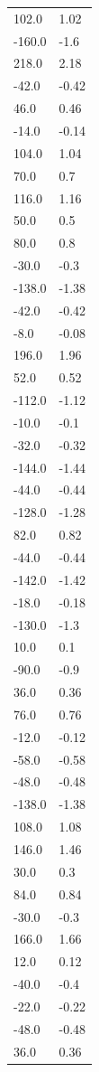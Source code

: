 \begin{longtable}{ll}
102.0 & 1.02 \\
-160.0 & -1.6 \\
218.0 & 2.18 \\
-42.0 & -0.42 \\
46.0 & 0.46 \\
-14.0 & -0.14 \\
104.0 & 1.04 \\
70.0 & 0.7 \\
116.0 & 1.16 \\
50.0 & 0.5 \\
80.0 & 0.8 \\
-30.0 & -0.3 \\
-138.0 & -1.38 \\
-42.0 & -0.42 \\
-8.0 & -0.08 \\
196.0 & 1.96 \\
52.0 & 0.52 \\
-112.0 & -1.12 \\
-10.0 & -0.1 \\
-32.0 & -0.32 \\
-144.0 & -1.44 \\
-44.0 & -0.44 \\
-128.0 & -1.28 \\
82.0 & 0.82 \\
-44.0 & -0.44 \\
-142.0 & -1.42 \\
-18.0 & -0.18 \\
-130.0 & -1.3 \\
10.0 & 0.1 \\
-90.0 & -0.9 \\
36.0 & 0.36 \\
76.0 & 0.76 \\
-12.0 & -0.12 \\
-58.0 & -0.58 \\
-48.0 & -0.48 \\
-138.0 & -1.38 \\
108.0 & 1.08 \\
146.0 & 1.46 \\
30.0 & 0.3 \\
84.0 & 0.84 \\
-30.0 & -0.3 \\
166.0 & 1.66 \\
12.0 & 0.12 \\
-40.0 & -0.4 \\
-22.0 & -0.22 \\
-48.0 & -0.48 \\
36.0 & 0.36 \\

\end{longtable}

